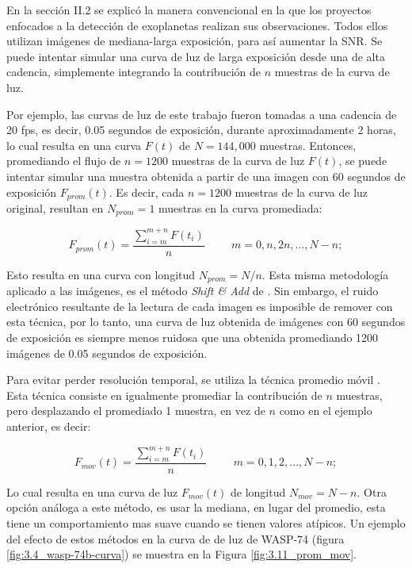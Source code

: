 En la sección II.2 se explicó la manera convencional en la que los proyectos enfocados a la detección de exoplanetas realizan sus observaciones. Todos ellos utilizan imágenes de mediana-larga exposición, para así aumentar la SNR. Se puede intentar simular una curva de luz de larga exposición desde una de alta cadencia, simplemente integrando la contribución de $n$ muestras de la curva de luz. 

Por ejemplo, las curvas de luz de este trabajo fueron tomadas a una cadencia de 20 fps, es decir, 0.05 segundos de exposición, durante aproximadamente 2 horas, lo cual resulta en una curva $F(t)$ de $N=144,000$ muestras. Entonces, promediando el flujo de $n=1200$ muestras de la curva de luz $F(t)$, se puede intentar simular una muestra obtenida a partir de una imagen con 60 segundos de exposición $F_{prom}(t)$. Es decir, cada $n=1200$ muestras de la curva de luz original, resultan en $N_{prom}=1$ muestras en la curva promediada:

\begin{equation}
  \displaystyle F_{prom}(t)=  \dfrac{\sum\limits_{i=m}^{m+n} F(t_{i})}{n}\hspace{1cm}m=0,n,2n,...,N-n;
\end{equation}

Esto resulta en una curva con longitud $N_{prom}=N/n$. Esta misma metodología aplicado a las imágenes, es el método \textit{Shift \& Add} de \cite{kluckers1996comparison}. Sin embargo, el ruido electrónico resultante de la lectura de cada imagen es imposible de remover con esta técnica, por lo tanto, una curva de luz obtenida de imágenes con 60 segundos de exposición es siempre menos ruidosa que una obtenida promediando 1200 imágenes de 0.05 segundos de exposición.

Para evitar perder resolución temporal, se utiliza la técnica promedio móvil \cite{borucki2009kepler}. Esta técnica consiste en igualmente promediar la contribución de $n$ muestras, pero desplazando el promediado 1 muestra, en vez de $n$ como en el ejemplo anterior, es decir:

\begin{equation}
  \displaystyle  F_{mov}(t)=  \dfrac{\sum\limits_{i=m}^{m+n} F(t_{i})}{n}\hspace{1cm}m=0,1,2,...,N-n;
\end{equation}

Lo cual resulta en una curva de luz $F_{mov}(t)$ de longitud  $N_{mov}=N-n$. Otra opción análoga a este método, es usar la mediana, en lugar del promedio, esta tiene un comportamiento mas suave cuando se tienen valores atípicos. Un ejemplo del efecto de estos métodos en la curva de de luz de WASP-74 (figura \ref{fig:3.4_wasp-74b-curva}) se muestra en la Figura \ref{fig:3.11_prom_mov}.

